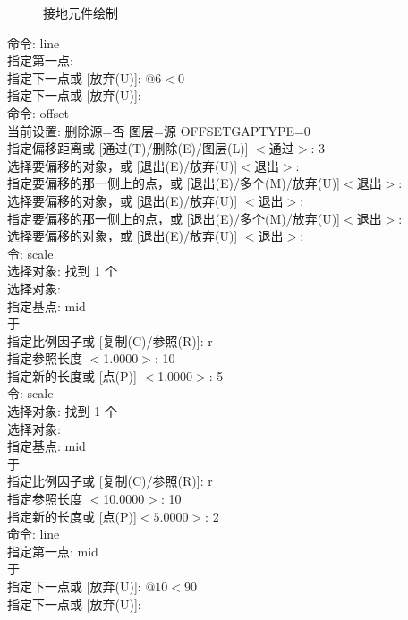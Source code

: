 \noindent
\begin{figure}[htbp]
\centering
{}\hspace{30pt}
\hspace{30pt}
\caption{接地元件绘制}
\end{figure}

\noindent
命令: line \\
指定第一点:\\
指定下一点或 [放弃(U)]: $@6<0$\\
指定下一点或 [放弃(U)]:\\
命令: offset\\
当前设置: 删除源=否  图层=源  OFFSETGAPTYPE=0\\
指定偏移距离或 [通过(T)/删除(E)/图层(L)] $<$通过$>$:  3\\
选择要偏移的对象，或 [退出(E)/放弃(U)]$<$退出$>$:\\
指定要偏移的那一侧上的点，或 [退出(E)/多个(M)/放弃(U)]$<$退出$>$:\\
选择要偏移的对象，或 [退出(E)/放弃(U)] $<$退出$>$:\\
指定要偏移的那一侧上的点，或 [退出(E)/多个(M)/放弃(U)]$<$退出$>$:\\
选择要偏移的对象，或 [退出(E)/放弃(U)] $<$退出$>$:\\
令: scale\\
选择对象: 找到 1 个\\
选择对象:\\
指定基点: mid\\
于\\
指定比例因子或 [复制(C)/参照(R)]: r\\
指定参照长度 $<$1.0000$>$: 10\\
指定新的长度或 [点(P)] $<$1.0000$>$:  5\\
令: scale\\
选择对象: 找到 1 个\\
选择对象:\\
指定基点: mid\\
于\\
指定比例因子或 [复制(C)/参照(R)]: r\\
指定参照长度 $<$10.0000$>$: 10\\
指定新的长度或 [点(P)]$ <5.0000>$:  2\\
命令: line \\
指定第一点: mid\\
于\\
指定下一点或 [放弃(U)]: $@10<90$\\
指定下一点或 [放弃(U)]:\\
\indent
